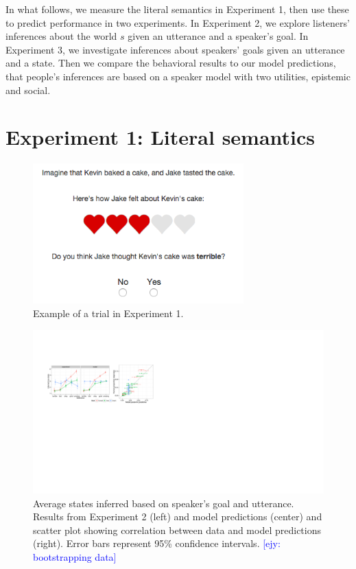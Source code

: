 \documentclass[10pt,letterpaper]{article}
\newcommand{\ejy}[1]{\textcolor{Blue}{[ejy: #1]}}
\begin{document}
In what follows, we measure the literal semantics in Experiment 1, then use these to predict performance in two experiments. In Experiment 2, we explore listeners' inferences about the world $s$ given an utterance and a speaker's goal. In Experiment 3, we investigate inferences about speakers' goals given an utterance and a state. 
Then we compare the behavioral results to our model predictions, that people's inferences are based on a speaker model with two utilities, epistemic and social. 

\section{Experiment 1: Literal semantics}

\begin{figure}[th]
\begin{centering}
\includegraphics[width=3.2in]{figures/example.png}
\caption{\label{fig:ex} Example of a trial in Experiment 1.}
\end{centering}
\end{figure}


\begin{figure}[t]
\begin{centering}
\includegraphics[width=\textwidth]{figures/state-inference-wScatter.pdf}
\caption{\label{fig:exp3} Average states inferred based on speaker's goal and utterance. Results from Experiment 2 (left) and model predictions (center) and scatter plot showing correlation between data and model predictions (right). Error bars represent 95\% confidence intervals.  \ejy{bootstrapping data}}
\end{centering}
\end{figure}
\end{document}
